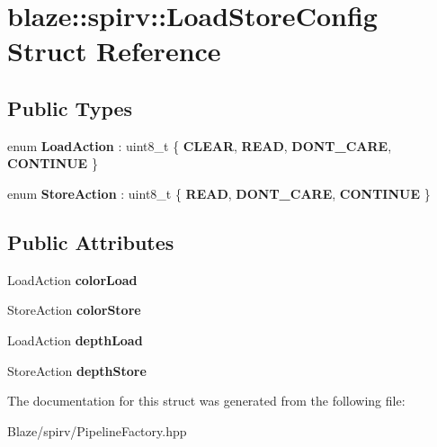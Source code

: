 \hypertarget{structblaze_1_1spirv_1_1LoadStoreConfig}{}\section{blaze\+:\+:spirv\+:\+:Load\+Store\+Config Struct Reference}
\label{structblaze_1_1spirv_1_1LoadStoreConfig}
\subsection*{Public Types}
\begin{DoxyCompactItemize}
\item 
\mbox{\label{structblaze_1_1spirv_1_1LoadStoreConfig_a2bd47bd27b91a989a5a067cd10f0f2bc}} 
enum {\bfseries Load\+Action} \+: uint8\+\_\+t \{ {\bfseries C\+L\+E\+AR}, 
{\bfseries R\+E\+AD}, 
{\bfseries D\+O\+N\+T\+\_\+\+C\+A\+RE}, 
{\bfseries C\+O\+N\+T\+I\+N\+UE}
 \}
\item 
\mbox{\label{structblaze_1_1spirv_1_1LoadStoreConfig_a2451861be4dc98e1020218ee93894b01}} 
enum {\bfseries Store\+Action} \+: uint8\+\_\+t \{ {\bfseries R\+E\+AD}, 
{\bfseries D\+O\+N\+T\+\_\+\+C\+A\+RE}, 
{\bfseries C\+O\+N\+T\+I\+N\+UE}
 \}
\end{DoxyCompactItemize}
\subsection*{Public Attributes}
\begin{DoxyCompactItemize}
\item 
\mbox{\label{structblaze_1_1spirv_1_1LoadStoreConfig_adea8f0f57ff9e70ab473b2311d3d7ea4}} 
Load\+Action {\bfseries color\+Load}
\item 
\mbox{\label{structblaze_1_1spirv_1_1LoadStoreConfig_a79b3ee4b72ed126c81baa6c284268254}} 
Store\+Action {\bfseries color\+Store}
\item 
\mbox{\label{structblaze_1_1spirv_1_1LoadStoreConfig_a1ca6776cbd39c9290adc1a86009b3a35}} 
Load\+Action {\bfseries depth\+Load}
\item 
\mbox{\label{structblaze_1_1spirv_1_1LoadStoreConfig_a43e9d40c16a08bf641edc2d7ce4701cb}} 
Store\+Action {\bfseries depth\+Store}
\end{DoxyCompactItemize}


The documentation for this struct was generated from the following file\+:\begin{DoxyCompactItemize}
\item 
Blaze/spirv/Pipeline\+Factory.\+hpp\end{DoxyCompactItemize}
